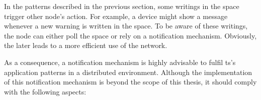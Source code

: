 In the patterns described in the previous section, some writings in the space trigger other node's action.
For example, a device might show a message whenever a new warning is written in the space. %
To be aware of these writings, the node can either poll the space or rely on a notification mechanism. %
Obviously, the later leads to a more efficient use of the network. %


As a consequence, a notification mechanism is highly advisable to fulfil \ac{ts}'s application patterns in a distributed environment.
Although the implementation of this notification mechanism is beyond the scope of this thesis,
it should comply with the following aspects:

